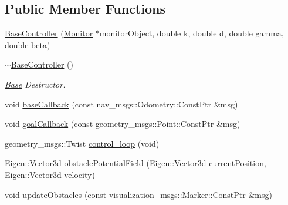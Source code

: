 \subsection*{Public Member Functions}
\begin{DoxyCompactItemize}
\item 
\hyperlink{class_base_controller_a0821816ec5a6012eac19f853ab0c2044}{Base\+Controller} (\hyperlink{class_monitor}{Monitor} $\ast$monitor\+Object, double k, double d, double gamma, double beta)
\item 
\hyperlink{class_base_controller_ab50e8c6a966189b4d6000e057e5978ed}{$\sim$\+Base\+Controller} ()
\begin{DoxyCompactList}\small\item\em \hyperlink{class_base}{Base} Destructor. \end{DoxyCompactList}\item 
void \hyperlink{class_base_controller_a8ebbdf4ee3ad99e304f8643d58b03cbf}{base\+Callback} (const nav\+\_\+msgs\+::\+Odometry\+::\+Const\+Ptr \&msg)
\item 
void \hyperlink{class_base_controller_a50fb5111564b5ae2c7918829883f81a2}{goal\+Callback} (const geometry\+\_\+msgs\+::\+Point\+::\+Const\+Ptr \&msg)
\item 
geometry\+\_\+msgs\+::\+Twist \hyperlink{class_base_controller_a7129f47562f34ff49f2ccba7274488ca}{control\+\_\+loop} (void)
\item 
Eigen\+::\+Vector3d \hyperlink{class_base_controller_a93753486d3cd87303aa4ba0a70602d64}{obstacle\+Potential\+Field} (Eigen\+::\+Vector3d current\+Position, Eigen\+::\+Vector3d velocity)
\item 
void \hyperlink{class_base_controller_ae7ddb6970a0beca3893f12d1d4b20743}{update\+Obstacles} (const visualization\+\_\+msgs\+::\+Marker\+::\+Const\+Ptr \&msg)
\end{DoxyCompactItemize}
